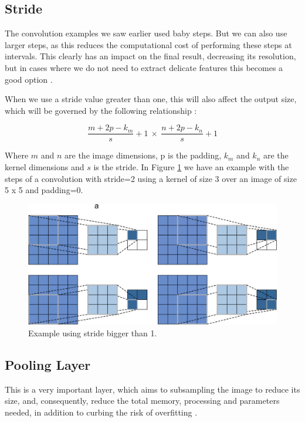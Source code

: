 \subsection{Stride}

The convolution examples we saw earlier used baby steps. But we can also use larger steps, as this reduces the computational cost of performing these steps at intervals. This clearly has an impact on the final result, decreasing its resolution, but in cases where we do not need to extract delicate features this becomes a good option \cite{goodfellow2016}.

When we use a stride value greater than one, this will also affect the output size, which will be governed by the following relationship \cite{adrian2017}:

\begin{equation}
\frac{m+2p-k_m}{s}+1 \  \times \ \frac{n+2p-k_n}{s}+1
\end{equation}

Where $m$ and $n$ are the image dimensions, p is the padding, $k_m$ and $k_n$ are the kernel dimensions and $s$ is the stride. In Figure \ref{fig:stride} we have an example with the steps of a convolution with stride=2 using a kernel of size 3 over an image of size 5 x 5 and padding=0.

\begin{figure}
    \centering
    \includegraphics[scale=0.20]{images/stride.png}
    \caption{Example using stride bigger than 1.}
    \label{fig:stride}
\end{figure}

\subsection{Pooling Layer}

This is a very important layer, which aims to subsampling the image to reduce its size, and, consequently, reduce the total memory, processing and parameters needed, in addition to curbing the risk of overfitting \cite{geron2019}\cite{adrian2017}\cite{elgendy2020}.

